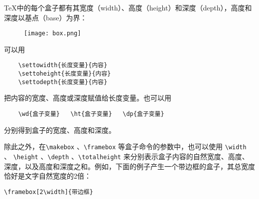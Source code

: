 \TeX 中的每个盒子都有其宽度（width）、高度（height）和深度（depth），高度和深度以基点（base）为界：

\begin{figure}[H]
    \centering
    \texttt{[image: box.png]}
\end{figure}

可以用
\begin{lstlisting}
    \settowidth{长度变量}{内容}
    \settoheight{长度变量}{内容}
    \settodepth{长度变量}{内容}
\end{lstlisting}

把内容的宽度、高度或深度赋值给长度变量。也可以用
\begin{lstlisting}
    \wd{盒子变量}   \ht{盒子变量}   \dp{盒子变量}
\end{lstlisting}
分别得到盒子的宽度、高度和深度。

除此之外，在\verb|\makebox| 、\verb|\framebox| 等盒子命令的参数中，也可以使用 \verb|\width| 、 \verb|\height| 、\verb|\depth| 、\verb|\totalheight| 来分别表示盒子内容的自然宽度、高度、深度，以及高度和深度之和。例如，下面的例子产生一个带边框的盒子，其总宽度恰好是文字自然宽度的2倍：

\begin{minipage}[t]{0.45\textwidth}
\begin{lstlisting}
\framebox[2\width]{带边框}
\end{lstlisting}
\end{minipage}
\hfill
\begin{minipage}[t]{0.45\textwidth}
\end{minipage}
